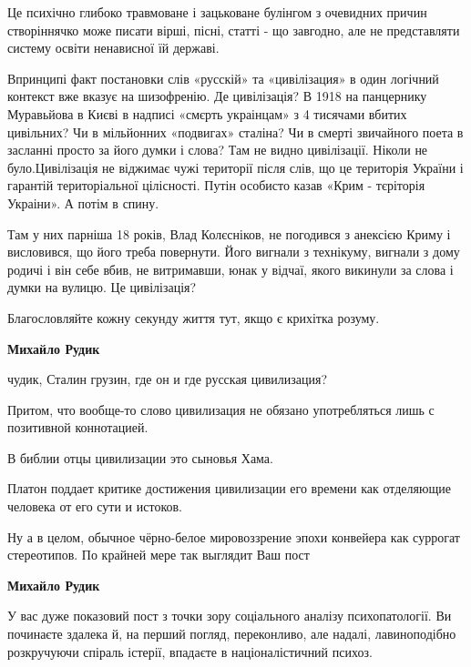\begin{itemize}
Це психічно глибоко травмоване і зацьковане булінгом з очевидних причин
створіннячко може писати вірші, пісні, статті - що завгодно, але не
представляти систему освіти ненависної їй державі.

Впринципі факт постановки слів «русскій» та «цивілізация» в один логічний
контекст вже вказує на шизофренію. Де цивілізація? В 1918 на панцернику
Муравьйова в Києві в надписі «смєрть украінцам» з 4 тисячами вбитих цивільних?
Чи в мільйонних «подвигах» сталіна? Чи в смерті звичайного поета в засланні
просто за його думки і слова? Там не видно цивілізації. Ніколи не
було.Цивілізація не віджимає чужі території після слів, що це територія України
і гарантій територіальної цілісності. Путін особисто казав «Крим - тєріторія
Украіни». А потім в спину.

Там у них парніша 18 років, Влад Колєсніков, не погодився з анексією Криму і
висловився, що його треба повернути. Його вигнали з технікуму, вигнали з дому
родичі і він себе вбив, не витримавши, юнак у відчаї, якого викинули за слова і
думки на вулицю. Це цивілізація?

Благословляйте кожну секунду життя тут, якщо є крихітка розуму.

\begin{itemize}

\textbf{Михайло Рудик} 

чудик, Сталин грузин, где он и где русская цивилизация?

Притом, что вообще-то слово цивилизация не обязано употребляться лишь с
позитивной коннотацией.

В библии отцы цивилизации это сыновья Хама.

Платон поддает критике достижения цивилизации его времени как отделяющие
человека от его сути и истоков.

Ну а в целом, обычное чёрно-белое мировоззрение эпохи конвейера как суррогат
стереотипов. По крайней мере так выглядит Ваш пост


\textbf{Михайло Рудик} 

У вас дуже показовий пост з точки зору соціального
аналізу психопатології. Ви починаєте здалека й, на перший погляд, переконливо,
але надалі, лавиноподібно розкручуючи спіраль істерії, впадаєте в
націоналістичний психоз. 


\end{itemize}
\end{itemize}
